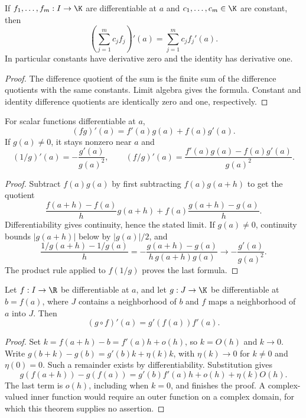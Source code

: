 \begin{proposition}
If $f_1,\ldots,f_m:I\to\K$ are differentiable at $a$ and $c_1,\ldots,c_m\in\K$ are constant, then
\[ \left(\sum_{j=1}^m c_jf_j\right)'(a)=\sum_{j=1}^m c_j f_j'(a). \]
In particular constants have derivative zero and the identity has derivative one.
\end{proposition}
\begin{proof}
The difference quotient of the sum is the finite sum of the difference quotients with the same constants. Limit algebra gives the formula. Constant and identity difference quotients are identically zero and one, respectively.
\end{proof}

\begin{theorem}
For scalar functions differentiable at $a$,
\[ (fg)'(a)=f'(a)g(a)+f(a)g'(a). \]
If $g(a)\ne0$, it stays nonzero near $a$ and
\[ (1/g)'(a)=-\frac{g'(a)}{g(a)^2},\qquad (f/g)'(a)=\frac{f'(a)g(a)-f(a)g'(a)}{g(a)^2}. \]
\end{theorem}
\begin{proof}
Subtract $f(a)g(a)$ by first subtracting $f(a)g(a+h)$ to get the quotient
\[ \frac{f(a+h)-f(a)}h g(a+h)+f(a)\frac{g(a+h)-g(a)}h. \]
Differentiability gives continuity, hence the stated limit. If $g(a)\ne0$, continuity bounds $|g(a+h)|$ below by $|g(a)|/2$, and
\[ \frac{1/g(a+h)-1/g(a)}h=-\frac{g(a+h)-g(a)}{h\,g(a+h)g(a)}\to-\frac{g'(a)}{g(a)^2}. \]
The product rule applied to $f(1/g)$ proves the last formula.
\end{proof}

\begin{theorem}
Let $f:I\to\R$ be differentiable at $a$, and let $g:J\to\K$ be differentiable at $b=f(a)$, where $J$ contains a neighborhood of $b$ and $f$ maps a neighborhood of $a$ into $J$. Then
\[ (g\circ f)'(a)=g'(f(a))f'(a). \]
\end{theorem}
\begin{proof}
Set $k=f(a+h)-b=f'(a)h+o(h)$, so $k=O(h)$ and $k\to0$. Write $g(b+k)-g(b)=g'(b)k+\eta(k)k$, with $\eta(k)\to0$ for $k\ne0$ and $\eta(0)=0$. Such a remainder exists by differentiability. Substitution gives
\[ g(f(a+h))-g(f(a))=g'(b)f'(a)h+o(h)+\eta(k)O(h). \]
The last term is $o(h)$, including when $k=0$, and  finishes the proof. A complex-valued inner function would require an outer function on a complex domain, for which this theorem supplies no assertion.
\end{proof}

